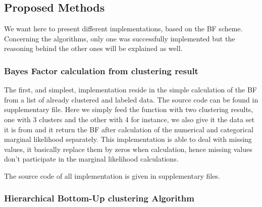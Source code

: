 \documentclass[twocolumn]{article}
\begin{document}
\subsection{Proposed Methods}

We want here to present different implementations, based on the BF scheme.
Concerning the algorithms, only one was successfully implemented but the reasoning behind the other ones will be explained as well.

\subsubsection{Bayes Factor calculation from clustering result}

The first, and simplest, implementation reside in the simple calculation of the BF from a list of already clustered and labeled data.
The source code can be found in supplementary file.
Here we simply feed the function with two clustering results, one with 3 clusters and the other with 4 for instance, we also give it the data set it is from and it return the BF after calculation of the numerical and categorical marginal likelihood separately.
This implementation is able to deal with missing values, it basically replace them by zeros when calculation, hence missing values don't participate in the marginal likelihood calculations.

The source code of all implementation is given in supplementary files.

\subsubsection{Hierarchical Bottom-Up clustering Algorithm}
\end{document}
